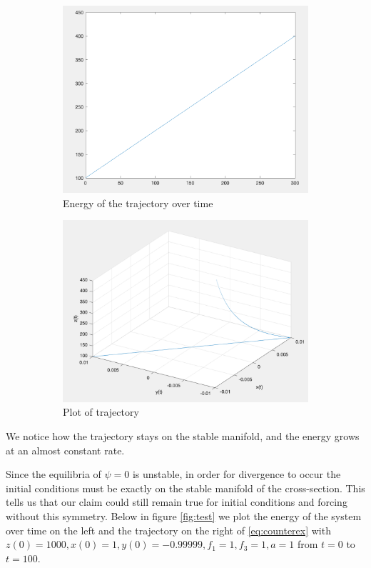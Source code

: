 \documentclass[11pt]{article}
\begin{document}
\begin{figure}[h!]
\centering
\begin{subfigure}{.5\textwidth}
  \centering
  \includegraphics[width=0.9\linewidth]{new4e.png}
  \caption{Energy of the trajectory over time}
  \label{}
\end{subfigure}%
\begin{subfigure}{.5\textwidth}
  \centering
  \includegraphics[width=0.92\linewidth]{new4p.png}
  \caption{Plot of trajectory}
  \label{}
\end{subfigure}
\caption{}
\label{fig:new4}
\end{figure}
We notice how the trajectory stays on the stable manifold, and the energy grows at an almost constant rate. 

Since the equilibria of $\psi = 0$ is unstable, in order for divergence to occur the initial conditions must be exactly on the stable manifold of the cross-section. This tells us that our claim could still remain true for initial conditions and forcing without this symmetry. Below in figure \ref{fig:test} we plot the energy of the system over time on the left and the trajectory on the right of \eqref{eq:counterex} with $z(0) = 1000, x(0) = 1, y(0) = -0.99999, f_1 = 1, f_3 = 1, a = 1$ from $t = 0$ to $t = 100$. 
\end{document}
